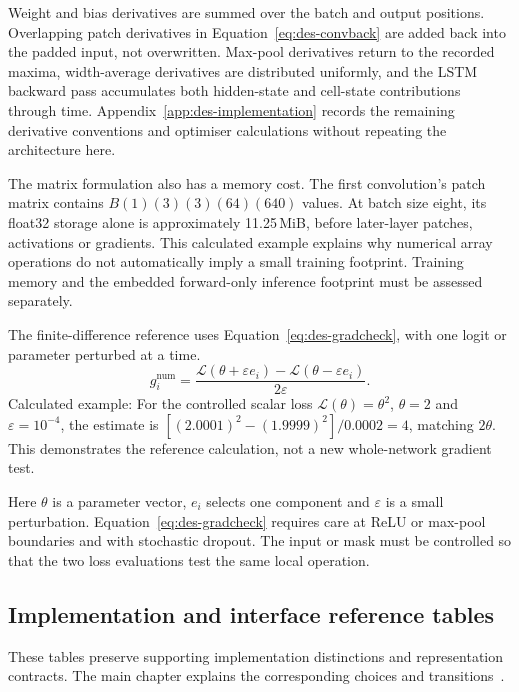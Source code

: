 Weight and bias derivatives are summed over the batch and output positions. Overlapping patch derivatives in Equation~\ref{eq:des-convback} are added back into the padded input, not overwritten. Max-pool derivatives return to the recorded maxima, width-average derivatives are distributed uniformly, and the LSTM backward pass accumulates both hidden-state and cell-state contributions through time. Appendix~\ref{app:des-implementation} records the remaining derivative conventions and optimiser calculations without repeating the architecture here.~\cite[project records; implementation]{brauneevidence2026,braunepipeline2026}

The matrix formulation also has a memory cost. The first convolution's patch matrix contains $B(1)(3)(3)(64)(640)$ values. At batch size eight, its float32 storage alone is approximately 11.25\,MiB, before later-layer patches, activations or gradients. This calculated example explains why numerical array operations do not automatically imply a small training footprint. Training memory and the embedded forward-only inference footprint must be assessed separately.~\cite[recognise.py; train.py; trainlibrary.py]{braunepipeline2026}



The finite-difference reference uses Equation~\ref{eq:des-gradcheck}, with one logit or parameter perturbed at a time.
\begin{equation}
g_i^{\mathrm{num}}=\frac{\mathcal L(\theta+\varepsilon e_i)
-\mathcal L(\theta-\varepsilon e_i)}{2\varepsilon}.
\label{eq:des-gradcheck}
\end{equation}
Calculated example: For the controlled scalar loss $\mathcal L(\theta)=\theta^2$, $\theta=2$ and $\varepsilon=10^{-4}$, the estimate is $[(2.0001)^2-(1.9999)^2]/0.0002=4$, matching $2\theta$. This demonstrates the reference calculation, not a new whole-network gradient test. \cite[\texttt{Evidence/bench.json}, CTC check]{brauneevidence2026}

Here $\theta$ is a parameter vector, $e_i$ selects one component and $\varepsilon$ is a small perturbation. Equation~\ref{eq:des-gradcheck} requires care at ReLU or max-pool boundaries and with stochastic dropout. The input or mask must be controlled so that the two loss evaluations test the same local operation.~\cite[recognise.py; train.py; trainlibrary.py]{braunepipeline2026}



\subsection{Implementation and interface reference tables}\label{app:des-reference-tables}
These tables preserve supporting implementation distinctions and representation contracts. The main chapter explains the corresponding choices and transitions~\cite[recognise.py; train.py; style.py; web/server.py]{braunepipeline2026}.


